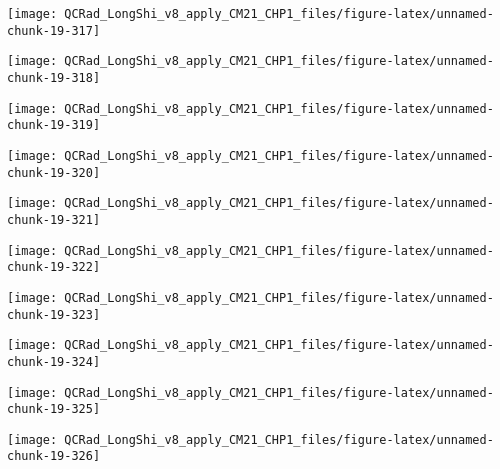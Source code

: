 \documentclass[
  10pt,
  a4paper,oneside]{article}
\begin{document}
\begin{center}\texttt{[image: QCRad\_LongShi\_v8\_apply\_CM21\_CHP1\_files/figure-latex/unnamed-chunk-19-317]} \end{center}

\begin{center}\texttt{[image: QCRad\_LongShi\_v8\_apply\_CM21\_CHP1\_files/figure-latex/unnamed-chunk-19-318]} \end{center}

\begin{center}\texttt{[image: QCRad\_LongShi\_v8\_apply\_CM21\_CHP1\_files/figure-latex/unnamed-chunk-19-319]} \end{center}

\begin{center}\texttt{[image: QCRad\_LongShi\_v8\_apply\_CM21\_CHP1\_files/figure-latex/unnamed-chunk-19-320]} \end{center}

\begin{center}\texttt{[image: QCRad\_LongShi\_v8\_apply\_CM21\_CHP1\_files/figure-latex/unnamed-chunk-19-321]} \end{center}

\begin{center}\texttt{[image: QCRad\_LongShi\_v8\_apply\_CM21\_CHP1\_files/figure-latex/unnamed-chunk-19-322]} \end{center}

\begin{center}\texttt{[image: QCRad\_LongShi\_v8\_apply\_CM21\_CHP1\_files/figure-latex/unnamed-chunk-19-323]} \end{center}

\begin{center}\texttt{[image: QCRad\_LongShi\_v8\_apply\_CM21\_CHP1\_files/figure-latex/unnamed-chunk-19-324]} \end{center}

\begin{center}\texttt{[image: QCRad\_LongShi\_v8\_apply\_CM21\_CHP1\_files/figure-latex/unnamed-chunk-19-325]} \end{center}

\begin{center}\texttt{[image: QCRad\_LongShi\_v8\_apply\_CM21\_CHP1\_files/figure-latex/unnamed-chunk-19-326]} \end{center}
\end{document}
